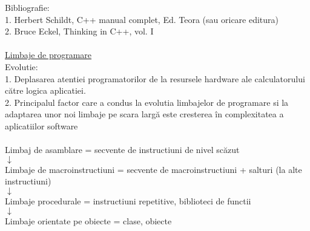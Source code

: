 \documentclass[12pt]{extarticle}
\begin{document}
	{\large
		Bibliografie: \\
		1. Herbert Schildt, C++ manual complet, Ed. Teora (sau oricare editura) \\
		2. Bruce Eckel, Thinking in C++, vol. I \\
		\\
		\underline{Limbaje de programare} \\
		Evolutie: \\
		1. Deplasarea atentiei programatorilor de la resursele hardware ale calculatorului către logica aplicatiei. \\
		2. Principalul factor care a condus la evolutia limbajelor de programare si la adaptarea unor noi limbaje pe scara largă este cresterea în complexitatea a aplicatiilor software \\
		\\
		Limbaj de asamblare = secvente de instructiuni de nivel scăzut \\
		$ \downarrow$ \\
		Limbaje de macroinstructiuni = secvente de macroinstructiuni + salturi (la alte instructiuni) \\
		$ \downarrow$ \\
		Limbaje procedurale = instructiuni repetitive, biblioteci de functii \\
		$ \downarrow$ \\
		Limbaje orientate pe obiecte = clase, obiecte \\
	}
\end{document}
